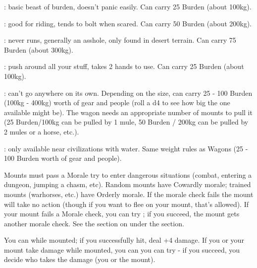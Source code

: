 
   
  : basic beast of burden, doesn't panic easily.  Can carry 25 Burden (about 100kg).

  :   good for riding, tends to bolt when scared.  Can carry 50 Burden (about 200kg).

  :  never runs, generally an asshole, only found in desert terrain.  Can carry 75 Burden (about 300kg).

  :  push around all your stuff, takes 2 hands to use.  Can carry 25 Burden (about 100kg).

  :  can't go anywhere on its own.  Depending on the size, can carry 25 - 100 Burden (100kg - 400kg) worth of gear and people (roll a d4 to see how big the one available might be).  The wagon needs an appropriate number of mounts to pull it (25 Burden/100kg can be pulled by 1 mule, 50 Burden / 200kg can be pulled by 2 mules or a horse, etc.).

  :  only available near civilizations with water.  Same weight rules as Wagons (25 - 100 Burden worth of gear and people).

\cbreak      

    
    Mounts must pass a Morale try to enter dangerous situations (combat, entering a dungeon, jumping a chasm, etc). Random mounts have Cowardly morale; trained mounts (warhorses, etc.) have Orderly morale.  If the morale check fails the mount will take no action (though if you want to flee on your mount, that's allowed). If your mount fails a Morale check, you can try ; if you succeed, the mount gets another morale check. See the section on  under the  section.

    You can  while mounted; if you successfully hit, deal +4 damage.  If you or your mount take damage while mounted, you can you can try  - if you succeed, you decide who takes the damage (you or the mount).


